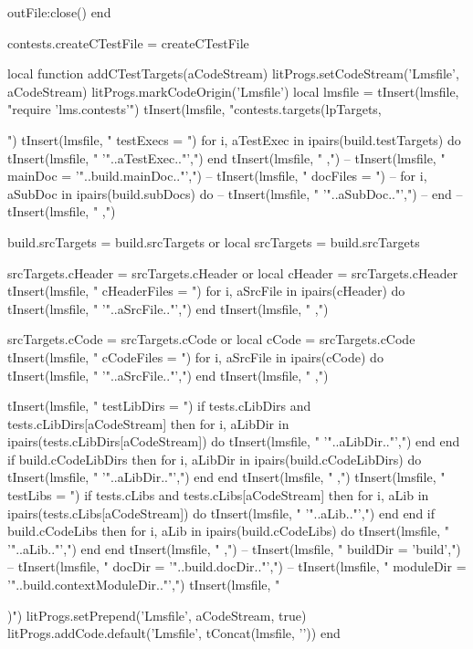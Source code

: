   outFile:close()
end

contests.createCTestFile = createCTestFile

local function addCTestTargets(aCodeStream)
  litProgs.setCodeStream('Lmsfile', aCodeStream)
  litProgs.markCodeOrigin('Lmsfile')
  local lmsfile = {}
  tInsert(lmsfile, "require 'lms.contests'\n")
  tInsert(lmsfile, "contests.targets(lpTargets, {")
  tInsert(lmsfile, "  testExecs = {")
  for i, aTestExec in ipairs(build.testTargets) do
    tInsert(lmsfile, "    '"..aTestExec.."',")
  end
  tInsert(lmsfile, "  },")
--  tInsert(lmsfile, "  mainDoc = '"..build.mainDoc.."',")
--  tInsert(lmsfile, "  docFiles = {")
--  for i, aSubDoc in ipairs(build.subDocs) do
--    tInsert(lmsfile, "    '"..aSubDoc.."',")
--  end
--  tInsert(lmsfile, "  },")

  build.srcTargets = build.srcTargets or { }
  local srcTargets = build.srcTargets
  
  srcTargets.cHeader = srcTargets.cHeader or { }
  local cHeader      = srcTargets.cHeader
  tInsert(lmsfile, "  cHeaderFiles = {")
  for i, aSrcFile in ipairs(cHeader) do
    tInsert(lmsfile, "    '"..aSrcFile.."',")
  end
  tInsert(lmsfile, "  },")
  
  srcTargets.cCode = srcTargets.cCode or { }
  local cCode      = srcTargets.cCode
  tInsert(lmsfile, "  cCodeFiles = {")
  for i, aSrcFile in ipairs(cCode) do
    tInsert(lmsfile, "    '"..aSrcFile.."',")
  end
  tInsert(lmsfile, "  },")

  tInsert(lmsfile, "  testLibDirs = {")
  if tests.cLibDirs and tests.cLibDirs[aCodeStream] then
    for i, aLibDir in ipairs(tests.cLibDirs[aCodeStream]) do
      tInsert(lmsfile, "    '"..aLibDir.."',")
    end
  end
  if build.cCodeLibDirs then 
    for i, aLibDir in ipairs(build.cCodeLibDirs) do
      tInsert(lmsfile, "    '"..aLibDir.."',")
    end
  end
  tInsert(lmsfile, "  },")
  tInsert(lmsfile, "  testLibs = {")
  if tests.cLibs and tests.cLibs[aCodeStream] then
    for i, aLib in ipairs(tests.cLibs[aCodeStream]) do
      tInsert(lmsfile, "    '"..aLib.."',")
    end
  end
  if build.cCodeLibs then 
    for i, aLib in ipairs(build.cCodeLibs) do
      tInsert(lmsfile, "    '"..aLib.."',")
    end
  end
  tInsert(lmsfile, "  },")
--  tInsert(lmsfile, "  buildDir  = 'build',")
--  tInsert(lmsfile, "  docDir    = '"..build.docDir.."',")
--  tInsert(lmsfile, "  moduleDir = '"..build.contextModuleDir.."',")
  tInsert(lmsfile, "})")
  litProgs.setPrepend('Lmsfile', aCodeStream, true)
  litProgs.addCode.default('Lmsfile', tConcat(lmsfile, '\n'))
end

